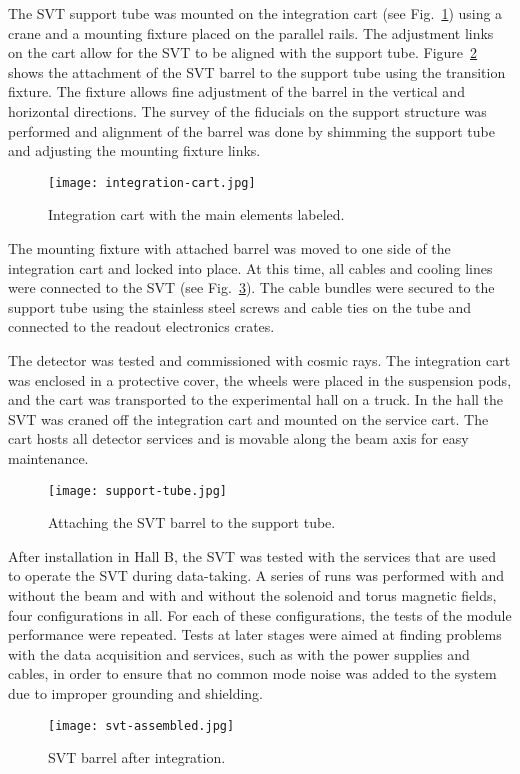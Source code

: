 The SVT support tube was mounted on the integration cart (see Fig.~\ref{fig:integration-cart}) using a crane and a mounting fixture placed on the parallel rails. The adjustment links on the cart allow for the SVT to be aligned with the support tube. Figure~\ref{fig:support-tube} shows the attachment of the SVT barrel to the support tube using the transition fixture. The fixture allows fine adjustment of the barrel in the vertical and horizontal directions. The survey of the fiducials on the support structure was performed and alignment of the barrel was done by shimming the support tube and adjusting the mounting fixture links. 

\begin{figure}[hbt] 
\centering 
\texttt{[image: integration-cart.jpg]}
\caption{Integration cart with the main elements labeled.}
\label{fig:integration-cart}
\end{figure}

The mounting fixture with attached barrel was moved to one side of the integration cart and locked into place. At this time, all cables and cooling lines were connected to the SVT (see Fig.~\ref{fig:svt-assembled}). The cable bundles were secured to the support tube using the stainless steel screws and cable ties on the tube and connected to the readout electronics crates. 

The detector was tested and commissioned with cosmic rays. The integration cart was enclosed in a protective cover, the wheels were placed in the suspension pods, and the cart was transported to the experimental hall on a truck. In the hall the SVT was craned off the integration cart and mounted on the service cart. The cart hosts all detector services and is movable along the beam axis for easy maintenance.

\begin{figure}[hbt] 
\centering 
\texttt{[image: support-tube.jpg]}
\caption{Attaching the SVT barrel to the support tube.}
\label{fig:support-tube}
\end{figure}

After installation in Hall B, the SVT was tested with the services that are used to operate the SVT during data-taking. A series of runs was performed with and without the beam and with and without the solenoid and torus magnetic fields, four configurations in all. For each of these configurations, the tests of the module performance were repeated. Tests at later stages were aimed at finding problems with the data acquisition and services, such as with the power supplies and cables, in order to ensure that no common mode noise was added to the system due to improper grounding and shielding. 

\begin{figure}[hbt] 
\centering 
\texttt{[image: svt-assembled.jpg]}
\caption{SVT barrel after integration.}
\label{fig:svt-assembled}
\end{figure}
